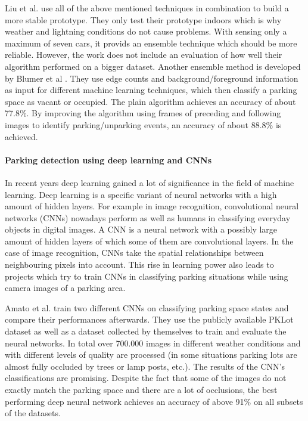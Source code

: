 Liu et al. \cite{stationary_camera_sensing} use all of the above mentioned techniques in combination to build a more stable prototype. They only test their prototype indoors which is why weather and lightning conditions do not cause problems. With sensing only a maximum of seven cars, it provids an ensemble technique which should be more reliable. However, the work does not include an evaluation of how well their algorithm performed on a bigger dataset. Another ensemble method is developed by Blumer et al \cite{Blumer2012}. They use edge counts and background/foreground information as input for different machine learning techniques, which then classify a parking space as vacant or occupied. The plain algorithm achieves an accuracy of about 77.8\%. By improving the algorithm using frames of preceding and following images to identify parking/unparking events, an accuracy of about 88.8\% is achieved.


\paragraph{Parking detection using deep learning and CNNs}

In recent years deep learning gained a lot of significance in the field of machine learning. Deep learning is a specific variant of neural networks with a high amount of hidden layers. For example in image recognition, convolutional neural networks (CNNs) nowadays perform as well as humans in classifying everyday objects in digital images. A CNN is a neural network with a possibly large amount of hidden layers of which some of them are convolutional layers. In the case of image recognition, CNNs take the spatial relationships between neighbouring pixels into account. This rise in learning power also leads to projects which try to train CNNs in classifying parking situations while using camera images of a parking area.

Amato et al. \cite{Amato2016} train two different CNNs on classifying parking space states and compare their performances afterwards. They use the publicly available PKLot dataset as well as a dataset collected by themselves to train and evaluate the neural networks. In total over 700.000 images in different weather conditions and with different levels of quality are processed (in some situations parking lots are almost fully occluded by trees or lamp posts, etc.). The results of the CNN's classifications are promising. Despite the fact that some of the images do not exactly match the parking space and there are a lot of occlusions, the best performing deep neural network achieves an accuracy of above 91\% on all subsets of the datasets.

